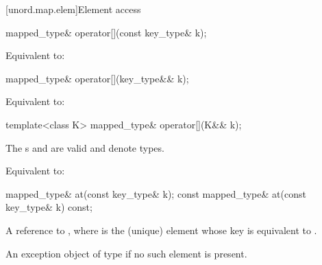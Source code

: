 [unord.map.elem]{Element access}

%
%
\begin{itemdecl}
mapped_type& operator[](const key_type& k);
\end{itemdecl}

\begin{itemdescr}
\pnum
\effects
Equivalent to: 
\end{itemdescr}

%
%
\begin{itemdecl}
mapped_type& operator[](key_type&& k);
\end{itemdecl}

\begin{itemdescr}
\pnum
\effects
Equivalent to: 
\end{itemdescr}

%
%
\begin{itemdecl}
template<class K> mapped_type& operator[](K&& k);
\end{itemdecl}

\begin{itemdescr}
\pnum
\constraints
The s  and
 are valid and denote types.

\pnum
\effects
Equivalent to: 
\end{itemdescr}

%
%
\begin{itemdecl}
mapped_type& at(const key_type& k);
const mapped_type& at(const key_type& k) const;
\end{itemdecl}

\begin{itemdescr}
\pnum
\returns
A reference to , where  is the (unique) element whose key is equivalent to .

\pnum
\throws
An exception object of type  if no such element is present.
\end{itemdescr}

